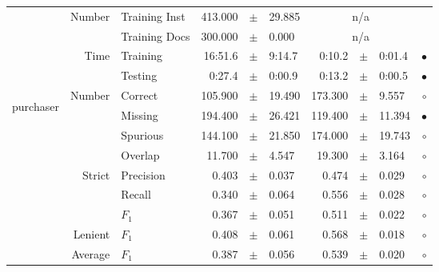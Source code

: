 \begin{longtable}{|r|r|l||rcl|rcl|c|}
\cline{2-10} & \multirow{2}{*}{    Number} &   Training Inst &     413.000 &  $\pm$  &      29.885 &    \multicolumn{3}{c|}{n/a}         &  \\
\cline{3-10} &                             &   Training Docs &     300.000 &  $\pm$  &       0.000 &    \multicolumn{3}{c|}{n/a}         &  \\
\cline{2-10} & \multirow{2}{*}{      Time} &        Training &     16:51.6 &  $\pm$  &      9:14.7 &      0:10.2 &  $\pm$  &      0:01.4 & $\bullet$ \\
\cline{3-10} &                             &         Testing &      0:27.4 &  $\pm$  &      0:00.9 &      0:13.2 &  $\pm$  &      0:00.5 & $\bullet$ \\
\hline
\hline
\multirow{11}{*}{\begin{sideways}purchaser\end{sideways} }
             & \multirow{4}{*}{    Number} &         Correct &     105.900 &  $\pm$  &      19.490 &     173.300 &  $\pm$  &       9.557 & $\circ$ \\
\cline{3-10} &                             &         Missing &     194.400 &  $\pm$  &      26.421 &     119.400 &  $\pm$  &      11.394 & $\bullet$ \\
\cline{3-10} &                             &        Spurious &     144.100 &  $\pm$  &      21.850 &     174.000 &  $\pm$  &      19.743 & $\circ$ \\
\cline{3-10} &                             &         Overlap &      11.700 &  $\pm$  &       4.547 &      19.300 &  $\pm$  &       3.164 & $\circ$ \\
\cline{2-10} & \multirow{3}{*}{    Strict} &       Precision &       0.403 &  $\pm$  &       0.037 &       0.474 &  $\pm$  &       0.029 & $\circ$ \\
\cline{3-10} &                             &          Recall &       0.340 &  $\pm$  &       0.064 &       0.556 &  $\pm$  &       0.028 & $\circ$ \\
\cline{3-10} &                             &           $F_1$ &       0.367 &  $\pm$  &       0.051 &       0.511 &  $\pm$  &       0.022 & $\circ$ \\
\cline{2-10} &                     Lenient &           $F_1$ &       0.408 &  $\pm$  &       0.061 &       0.568 &  $\pm$  &       0.018 & $\circ$ \\
\cline{2-10} &                     Average &           $F_1$ &       0.387 &  $\pm$  &       0.056 &       0.539 &  $\pm$  &       0.020 & $\circ$ \\

\end{longtable}
